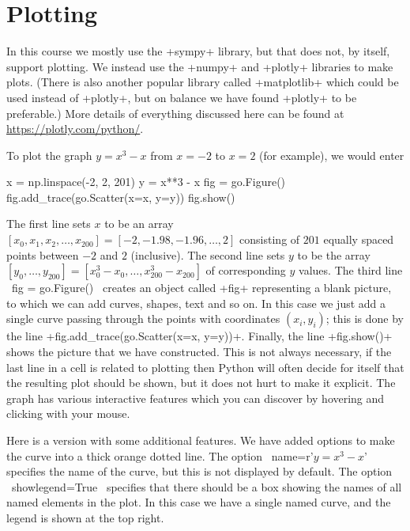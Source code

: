 \documentclass[a4paper,10pt]{amsbook}
\begin{document}
\section{Plotting}

In this course we mostly use the \pcode+sympy+ library, but that does
not, by itself, support plotting.  We instead use the \pcode+numpy+
and \pcode+plotly+ libraries to make plots.  (There is also another
popular library called \pcode+matplotlib+ which could be used instead
of \pcode+plotly+, but on balance we have found \pcode+plotly+ to be
preferable.)  More details of everything discussed here can be found
at \url{https://plotly.com/python/}.

\begin{secenum}
%
 \item\label{basicplot} To plot the graph $y=x^3-x$ from $x=-2$ to $x=2$ (for
  example), we would enter
  \begin{pcodeblock}
   x = np.linspace(-2, 2, 201)
   y = x**3 - x
   fig = go.Figure()
   fig.add_trace(go.Scatter(x=x, y=y))
   fig.show()
  \end{pcodeblock}
  The first line sets $x$ to be an array
  $[x_0,x_1,x_2,\dotsc,x_{200}]=[-2,-1.98,-1.96,\dotsc,2]$ consisting
  of $201$ equally spaced points between $-2$ and $2$ (inclusive).
  The second line sets $y$ to be the array
  $[y_0,\dotsc,y_{200}]=[x_0^3-x_0,\dotsc,x_{200}^3-x_{200}]$ of
  corresponding $y$ values.  The
  third line \pcode~fig = go.Figure()~ creates an object called
  \pcode+fig+ representing a blank 
  picture, to which we can add curves, shapes, text and so on.  In this
  case we just add a single curve passing through the points with
  coordinates $(x_i,y_i)$; this is done by the line
  \pcode+fig.add_trace(go.Scatter(x=x, y=y))+.  Finally, the line
  \pcode+fig.show()+ shows the picture that we have constructed.
  This is not always necessary, if the last line in a cell is related
  to plotting then Python will often decide for itself that the
  resulting plot should be shown, but it does not hurt to make it
  explicit.  The graph has various interactive features which you can
  discover by hovering and clicking with your mouse. 
% 
 \item\label{legend}
Here is a version with some additional features.  We have added
options to make the curve into a thick orange dotted line.  The option
\pcode~name=r'$y = x^3-x$'~ specifies the name of the curve, but this is not
displayed by default.  The option \pcode~showlegend=True~ specifies that
there should be a box showing the names of all named elements in the
plot.  In this case we have a single named curve, and the legend is
shown at the top right. 


\end{secenum}
\end{document}
